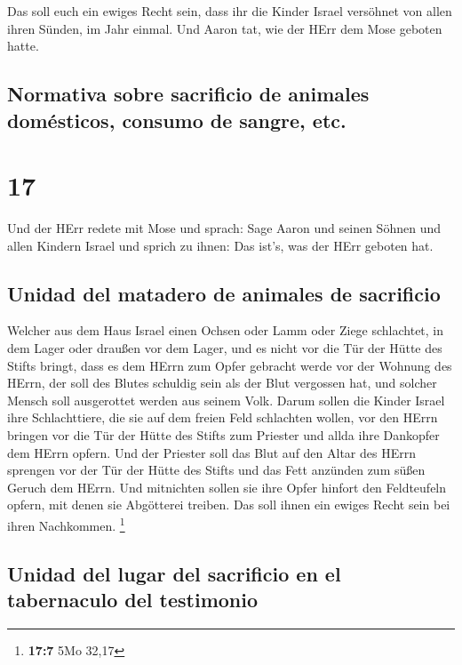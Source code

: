  Das soll euch ein ewiges Recht sein, dass ihr die Kinder
Israel versöhnet von allen ihren Sünden, im Jahr einmal. Und Aaron tat,
wie der HErr dem Mose geboten hatte.

\hypertarget{normativa-sobre-sacrificio-de-animales-domuxe9sticos-consumo-de-sangre-etc.}{%
\subsection{Normativa sobre sacrificio de animales domésticos, consumo
de sangre,
etc.}\label{normativa-sobre-sacrificio-de-animales-domuxe9sticos-consumo-de-sangre-etc.}}

\hypertarget{section-16}{%
\section{17}\label{section-16}}

 Und der HErr redete mit Mose und sprach: 
Sage Aaron und seinen Söhnen und allen Kindern Israel und sprich zu
ihnen: Das ist's, was der HErr geboten hat.

\hypertarget{unidad-del-matadero-de-animales-de-sacrificio}{%
\subsection{Unidad del matadero de animales de
sacrificio}\label{unidad-del-matadero-de-animales-de-sacrificio}}

 Welcher aus dem Haus Israel einen Ochsen oder Lamm oder
Ziege schlachtet, in dem Lager oder draußen vor dem Lager,
 und es nicht vor die Tür der Hütte des Stifts bringt,
dass es dem HErrn zum Opfer gebracht werde vor der Wohnung des HErrn,
der soll des Blutes schuldig sein als der Blut vergossen hat, und
solcher Mensch soll ausgerottet werden aus seinem Volk. 
Darum sollen die Kinder Israel ihre Schlachttiere, die sie auf dem
freien Feld schlachten wollen, vor den HErrn bringen vor die Tür der
Hütte des Stifts zum Priester und allda ihre Dankopfer dem HErrn opfern.
 Und der Priester soll das Blut auf den Altar des HErrn
sprengen vor der Tür der Hütte des Stifts und das Fett anzünden zum
süßen Geruch dem HErrn.  Und mitnichten sollen sie ihre
Opfer hinfort den Feldteufeln opfern, mit denen sie Abgötterei treiben.
Das soll ihnen ein ewiges Recht sein bei ihren Nachkommen. \footnote{\textbf{17:7}
  5Mo 32,17}

\hypertarget{unidad-del-lugar-del-sacrificio-en-el-tabernaculo-del-testimonio}{%
\subsection{Unidad del lugar del sacrificio en el tabernaculo del
testimonio}\label{unidad-del-lugar-del-sacrificio-en-el-tabernaculo-del-testimonio}}

